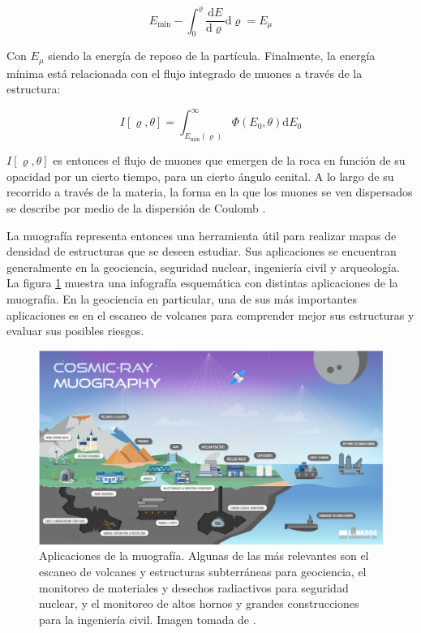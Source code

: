 \documentclass[12pt]{report}
\begin{document}
\begin{equation}E_{\min }-\int_{0}^{\varrho} \frac{\mathrm{d} E}{\mathrm{d} \varrho} \mathrm{d} \varrho=E_{\mu}\end{equation}

Con $E_{\mu}$ siendo la energía de reposo de la partícula. Finalmente, la energía mínima está relacionada con el flujo integrado de muones a través de la estructura:

\begin{equation}I[\varrho, \theta]=\int_{E_{\min }(\varrho)}^{\infty} \Phi\left(E_{0}, \theta\right) \mathrm{d} E_{0}
\end{equation}

$I[\varrho,\theta]$ es entonces el flujo de muones que emergen de la roca en función de su opacidad por un cierto tiempo, para un cierto ángulo cenital. A lo largo de su recorrido a través de la materia, la forma en la que los muones se ven dispersados se describe por medio de la dispersión de Coulomb \cite{lesparre2010geophysical}.


La muografía representa entonces una herramienta útil para realizar mapas de densidad de estructuras que se deseen estudiar. Sus aplicaciones se encuentran generalmente en la geociencia, seguridad nuclear, ingeniería civil y arqueología. La figura \ref{fig:applications} muestra una infografía esquemática con distintas aplicaciones de la muografía. En la geociencia en particular, una de sus más importantes aplicaciones es en el escaneo de volcanes para comprender mejor sus estructuras y evaluar sus posibles riesgos.

\begin{figure}[h]
    \centering
    \includegraphics[width=\textwidth]{images/applications.png}
    \caption{Aplicaciones de la muografía. Algunas de las más relevantes son el escaneo de volcanes y estructuras subterráneas para geociencia, el monitoreo de materiales y desechos radiactivos para seguridad nuclear, y el monitoreo de altos hornos y grandes construcciones para la ingeniería civil. Imagen tomada de \cite{kaiser2019muography}.}
    \label{fig:applications}
\end{figure}
\end{document}
